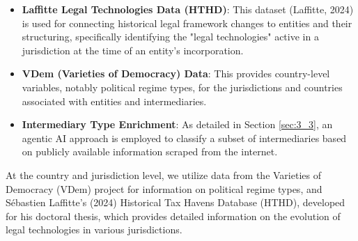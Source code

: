 \begin{itemize}
    \item \textbf{Laffitte Legal Technologies Data (HTHD)}: This dataset (Laffitte, 2024) is used for connecting historical legal framework changes to entities and their structuring, specifically identifying the "legal technologies" active in a jurisdiction at the time of an entity's incorporation.
    \item \textbf{VDem (Varieties of Democracy) Data}: This provides country-level variables, notably political regime types, for the jurisdictions and countries associated with entities and intermediaries.
    \item \textbf{Intermediary Type Enrichment}: As detailed in Section \ref{sec:3_3}, an agentic AI approach is employed to classify a subset of intermediaries based on publicly available information scraped from the internet.
\end{itemize}

At the country and jurisdiction level, we utilize data from the Varieties of Democracy (VDem) project for information on political regime types, and Sébastien Laffitte's (2024) Historical Tax Havens Database (HTHD), developed for his doctoral thesis, which provides detailed information on the evolution of legal technologies in various jurisdictions.

